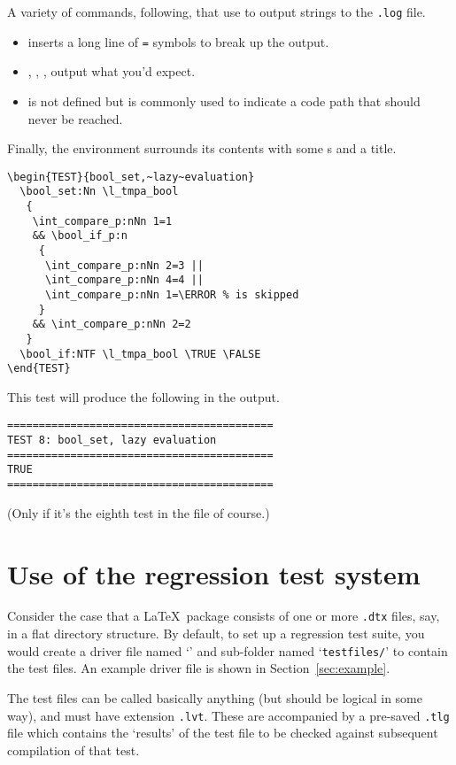 \documentclass[a4paper]{ltugboat}
\begin{document}
A variety of commands, following, that use  to output strings to the \texttt{.log} file.
\begin{itemize}
\item
{} inserts a long line of \texttt{=} symbols to break up the output.
\item
{}, , ,  output what you'd expect.
\item
{} is not defined but is commonly used to indicate a code path that should never be reached.
\end{itemize}
Finally, the  environment surrounds its contents with some s and a title.
\begin{Verbatim}
\begin{TEST}{bool_set,~lazy~evaluation}
  \bool_set:Nn \l_tmpa_bool
   {
    \int_compare_p:nNn 1=1
    && \bool_if_p:n
     {
      \int_compare_p:nNn 2=3 ||
      \int_compare_p:nNn 4=4 ||
      \int_compare_p:nNn 1=\ERROR % is skipped
     }
    && \int_compare_p:nNn 2=2
   }
  \bool_if:NTF \l_tmpa_bool \TRUE \FALSE
\end{TEST}
\end{Verbatim}
This test will produce the following in the output.
\begin{Verbatim}
==========================================
TEST 8: bool_set, lazy evaluation
==========================================
TRUE
==========================================
\end{Verbatim}
(Only if it's the eighth test in the file of course.)

\section{Use of the regression test system}

Consider the case that a \LaTeX\ package consists of one or more \texttt{.dtx} files, say, in a flat directory structure.
By default, to set up a regression test suite, you would create a driver file named `\texttt{\drivername}' and sub-folder named `\texttt{testfiles/}' to contain the test files.
An example driver file is shown in Section~\ref{sec:example}.

The test files can be called basically anything (but should be logical in some way), and must have extension \texttt{.lvt}.
These are accompanied by a pre-saved \texttt{.tlg} file which contains the `results' of the test file to be checked against subsequent compilation of that test.
\end{document}
